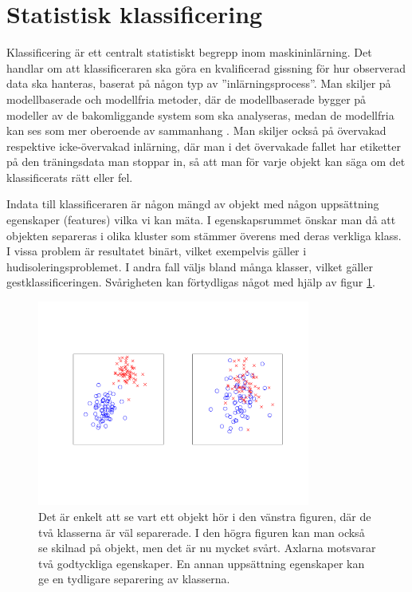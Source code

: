 \documentclass[../rapport_MVEX01-11-05]{subfiles}
\begin{document}
\section{Statistisk klassificering}\label{sec:klassificering}

Klassificering är ett centralt statistiskt begrepp inom maskininlärning.
Det handlar om att klassificeraren ska göra en kvalificerad gissning för hur
observerad data ska hanteras, baserat på någon typ av ''inlärningsprocess''.
Man skiljer på modellbaserade och modellfria metoder, där de modellbaserade
bygger på modeller av de bakomliggande system som ska analyseras, medan de
modellfria kan ses som mer oberoende av sammanhang \cite{Hastie09}.
Man skiljer också på övervakad respektive icke-övervakad inlärning,
där man i det övervakade fallet har etiketter på den träningsdata man stoppar
in, så att man för varje objekt kan säga om det klassificerats rätt eller
fel.

Indata till klassificeraren är någon mängd av objekt med någon uppsättning
egenskaper (features) vilka vi kan mäta.
I egenskapsrummet önskar man då att objekten separeras i olika kluster
som stämmer överens med deras verkliga klass.
I vissa problem är resultatet binärt,
vilket exempelvis gäller i hudisoleringsproblemet.
I andra fall väljs bland många klasser, vilket gäller gestklassificeringen.
Svårigheten kan förtydligas något med hjälp av figur \ref{fig:kluster}.
\begin{figure}[!htpb]
    \begin{center}
\includegraphics[width=0.8\textwidth,clip=true,trim=2cm 3cm 1.5cm 3cm]{bilder/kluster.pdf}
    \end{center}
    \caption{Det är enkelt att se vart ett objekt hör i den vänstra figuren,
    där de två klasserna är väl separerade. I den högra figuren kan man också se
    skilnad på objekt, men det är nu mycket svårt. Axlarna motsvarar
    två godtyckliga egenskaper. En annan uppsättning egenskaper kan ge en
    tydligare separering av klasserna.}
    \label{fig:kluster}
\end{figure}
\end{document}
